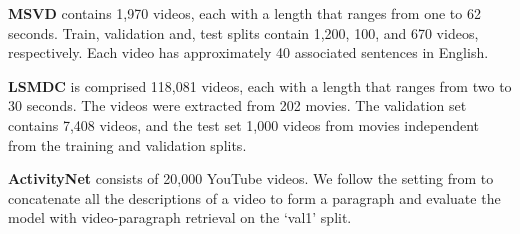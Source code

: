 \documentclass[11pt]{article}
\begin{document}
    \noindent
	\textbf{MSVD} \cite{chen2011collecting} contains 1,970 videos, each with a length that ranges from one to 62 seconds. Train, validation and, test splits contain 1,200, 100, and 670 videos, respectively. Each video has approximately 40 associated sentences in English.

	\noindent
	\textbf{LSMDC} \cite{Rohrbach2015LSMDC} is comprised 118,081 videos, each with a length that ranges from two to 30 seconds. The videos were extracted from 202 movies. The validation set contains 7,408 videos, and the test set 1,000 videos from movies independent from the training and validation splits.

	\noindent
	\textbf{ActivityNet} \cite{krishna2017dense} consists of 20,000 YouTube videos. We follow the setting from \cite{bowen2018cross,Gabeur2020MMT} to concatenate all the descriptions of a video to form a paragraph and evaluate the model with video-paragraph retrieval on the `val1' split.
\end{document}

